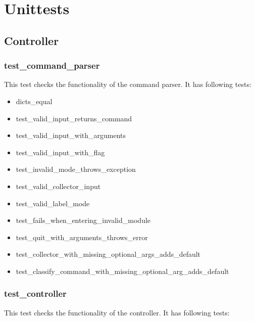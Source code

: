 \documentclass[parskip=full]{scrartcl}
\begin{document}
\section{Unittests}

\subsection{Controller}
\subsubsection{test\_command\_parser}
This test checks the functionality of the command parser.
It has following tests:

\begin{itemize}

\item dicts\_equal

\item test\_valid\_input\_returns\_command

\item test\_valid\_input\_with\_arguments

\item test\_valid\_input\_with\_flag

\item test\_invalid\_mode\_throws\_exception

\item test\_valid\_collector\_input

\item test\_valid\_label\_mode

\item test\_fails\_when\_entering\_invalid\_module

\item test\_quit\_with\_arguments\_throws\_error

\item test\_collector\_with\_missing\_optional\_args\_adds\_default

\item test\_classify\_command\_with\_missing\_optional\_arg\_adds\_default

\end{itemize}

\subsubsection{test\_controller}
This test checks the functionality of the controller.
It has following tests:
\end{document}
